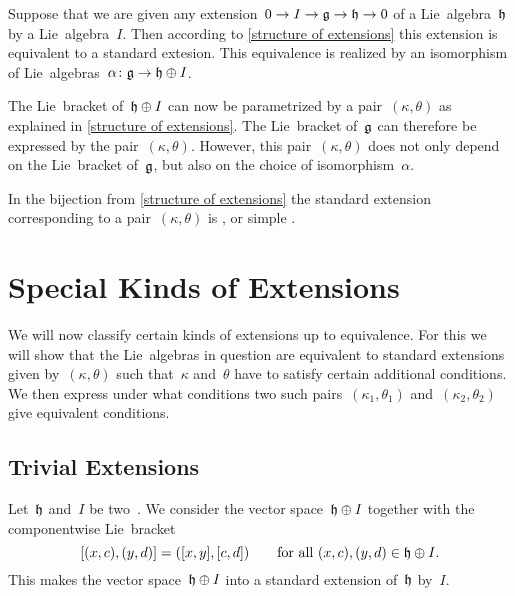 \begin{warning}
  Suppose that we are given any extension~$0 \to I \to \glie \to \hlie \to 0$ of a Lie~algebra~$\mathfrak{h}$ by a Lie~algebra~$I$.
  Then according to \cref{structure of extensions} this extension is equivalent to a standard extesion.
  This equivalence is realized by an isomorphism of Lie~algebras~$\alpha \colon \glie \to \hlie \oplus I$.

  The Lie~bracket of~$\mathfrak{h} \oplus I$ can now be parametrized by a pair~$(\kappa, \theta)$ as explained in \cref{structure of extensions}.
  The Lie~bracket of~$\mathfrak{g}$ can therefore be expressed by the pair~$(\kappa, \theta)$.
  However, this pair~$(\kappa, \theta)$ does not only depend on the Lie~bracket of~$\mathfrak{g}$, but also on the choice of isomorphism~$\alpha$.
\end{warning}


\begin{definition}
  In the bijection from \cref{structure of extensions} the standard extension corresponding to a pair~$(\kappa, \theta)$ is , or simple .
\end{definition}





\section{Special Kinds of Extensions}


\begin{fluff}
  We will now classify certain kinds of extensions up to equivalence.
  For this we will show that the Lie~algebras in question are equivalent to standard extensions given by~$(\kappa, \theta)$ such that~$\kappa$ and~$\theta$ have to satisfy certain additional conditions.
  We then express under what conditions two such pairs~$(\kappa_1, \theta_1)$ and~$(\kappa_2, \theta_2)$ give equivalent conditions.
\end{fluff}



\subsection{Trivial Extensions}


\begin{example}
  \label{construction of trivial extension}
  Let~$\mathfrak{h}$ and~$I$ be two~\liealgebras{$\kf$}.
  We consider the vector space~$\mathfrak{h} \oplus I$ together with the componentwise Lie~bracket
  \[
    [ (x,c), (y,d) ]
    =
    ( [x,y], [c,d] )
    \qquad
    \text{for all~$(x,c), (y,d) \in \mathfrak{h} \oplus I$.}
  \]
  This makes the vector space~$\mathfrak{h} \oplus I$ into a standard extension of~$\mathfrak{h}$ by~$I$.
\end{example}


